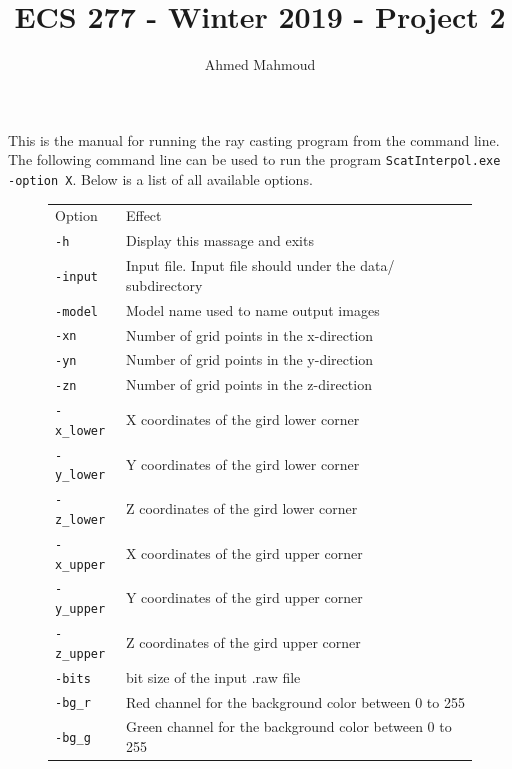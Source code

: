 \documentclass[12pt]{article}
\begin{document}
\captionsetup[subfigure]{labelformat=empty}

\title{ECS 277 - Winter 2019 - Project 2}
\author{Ahmed Mahmoud}
\date{} 

\maketitle

This is the manual for running the ray casting program from the command line. The following command line can be used to run the program  \texttt{ScatInterpol.exe -option X}. Below is a list of all available options. 
\vspace{5mm}

\begin{figure}[tbh]

  
\begin{tabular}{ |l| l|}
  \hline
  Option & Effect   \\ \hhline{|=|=|}
  \texttt{-h}  &  Display this massage and exits \\
  \texttt{-input}  &  Input file. Input file should under the \textsf{data/} subdirectory \\
  \texttt{-model}  &   Model name used to name output images \\
  \texttt{-xn}  &    Number of grid points in the x-direction \\
  \texttt{-yn}  &    Number of grid points in the y-direction \\
  \texttt{-zn}  &    Number of grid points in the z-direction \\
  \texttt{-x\_lower}  &     X coordinates of the gird lower corner \\
  \texttt{-y\_lower}  &     Y coordinates of the gird lower corner \\
  \texttt{-z\_lower}  &     Z coordinates of the gird lower corner \\
  \texttt{-x\_upper}  &      X coordinates of the gird upper corner \\  
  \texttt{-y\_upper}  &      Y coordinates of the gird upper corner \\  
  \texttt{-z\_upper}  &      Z coordinates of the gird upper corner \\  
  \texttt{-bits}  &      bit size of the input .raw file \\  
  \texttt{-bg\_r}  &      Red channel for the background color between 0 to 255 \\  
  \texttt{-bg\_g}  &      Green channel for the background color between 0 to 255 \\  

\end{tabular}
\end{figure}
\end{document}
